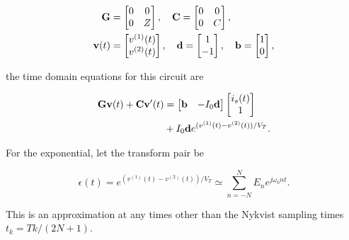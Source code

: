 \begin{equation}\label{eqn:ece1254projectReport:640}
\begin{aligned}
\BG &=
\begin{bmatrix}
0 & 0 \\
0 & Z \\
\end{bmatrix}, \quad
\BC =
\begin{bmatrix}
0 & 0 \\
0 & C \\
\end{bmatrix}, \\
\Bv(t) &=
\begin{bmatrix}
v^{(1)}(t) \\
v^{(2)}(t) \\
\end{bmatrix}, \quad
\Bd =
\begin{bmatrix}
1 \\
-1
\end{bmatrix}, \quad
\Bb =
\begin{bmatrix}
1 \\
0
\end{bmatrix},
\end{aligned}
\end{equation}

the time domain equations for this circuit are

\begin{equation}\label{eqn:ece1254projectReport:1320}
\begin{aligned}
\BG \Bv(t)
+\BC \Bv'(t)
&=
\begin{bmatrix}
\Bb & -I_0 \Bd
\end{bmatrix}
\begin{bmatrix}
i_s(t) \\
1
\end{bmatrix} \\
&+
I_0 \Bd
e^{ (v^{(1)}(t) - v^{(2)}(t))/V_T}.
\end{aligned}
\end{equation}

For the exponential, let the transform pair be

\begin{equation}\label{eqn:ece1254projectReport:1300}
\epsilon(t) =
e^{ (v^{(1)}(t) - v^{(2)}(t))/V_T}
\simeq
\sum_{n=-N}^N E_n e^{ j \omega_0 n t }.
\end{equation}

This is an approximation at any times other than the Nykvist sampling times \( t_k = T k/(2 N + 1) \).

